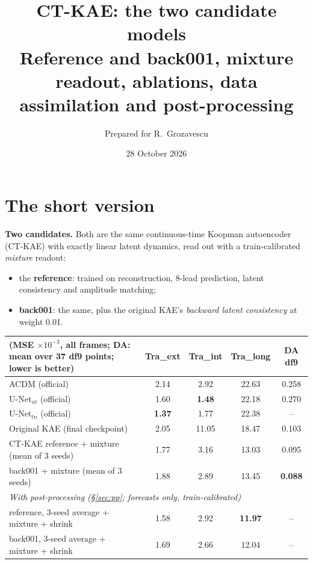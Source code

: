 \documentclass[10.5pt,a4paper]{article}
\title{\textbf{CT-KAE: the two candidate models}\\[2pt]
\large Reference and back001, mixture readout, ablations, data assimilation and post-processing}
\author{Prepared for R.~Grozavescu}
\date{28 October 2026}
\begin{document}
\maketitle

\section*{The short version}

\textbf{Two candidates.} Both are the same continuous-time Koopman autoencoder (CT-KAE) with
exactly linear latent dynamics, read out with a train-calibrated \emph{mixture} readout:
\begin{itemize}
\item the \textbf{reference}: trained on reconstruction, 8-lead prediction, latent consistency
  and amplitude matching;
\item \textbf{back001}: the same, plus the original KAE's \emph{backward latent consistency} at
  weight 0.01.
\end{itemize}

\begin{center}\small
\begin{tabular}{lcccc}
\toprule
 (MSE $\times10^{-3}$, all frames; DA: mean over 37 df9 points; lower is better)
 & Tra\_ext & Tra\_int & Tra\_long & DA df9\\
\midrule
ACDM (official)                      & 2.14 & 2.92 & 22.63 & 0.258\\
U-Net$_{ut}$ (official)               & 1.60 & \textbf{1.48} & 22.18 & 0.270\\
U-Net$_{tn}$ (official)               & \textbf{1.37} & 1.77 & 22.38 & --\\
Original KAE (final checkpoint)       & 2.05 & 11.05 & 18.47 & 0.103\\
CT-KAE reference + mixture (mean of 3 seeds)  & 1.77 & 3.16 & 13.03 & 0.095\\
back001 + mixture (mean of 3 seeds)           & 1.88 & 2.89 & 13.45 & \textbf{0.088}\\
\midrule
\multicolumn{5}{l}{\emph{With post-processing (\S\ref{sec:pp}; forecasts only, train-calibrated)}}\\
reference, 3-seed average + mixture + shrink  & 1.58 & 2.92 & \textbf{11.97} & --\\
back001, 3-seed average + mixture + shrink    & 1.69 & 2.66 & 12.04 & --\\
\bottomrule
\end{tabular}
\end{center}
\end{document}
